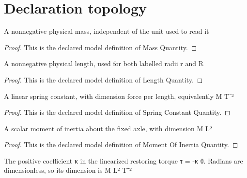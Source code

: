 \section{Declaration topology}
\begin{definition}
  \label{def:physics:phyx-mini-0272:phyxminiproblems-problemphyxmini0272-massquantity}
  A nonnegative physical mass, independent of the unit used to read it
\end{definition}
\begin{proof}
  This is the declared model definition of Mass Quantity.
\end{proof}
\begin{definition}
  \label{def:physics:phyx-mini-0272:phyxminiproblems-problemphyxmini0272-lengthquantity}
  A nonnegative physical length, used for both labelled radii r and R
\end{definition}
\begin{proof}
  This is the declared model definition of Length Quantity.
\end{proof}
\begin{definition}
  \label{def:physics:phyx-mini-0272:phyxminiproblems-problemphyxmini0272-springconstantquantity}
  A linear spring constant, with dimension force per length, equivalently M T⁻²
\end{definition}
\begin{proof}
  This is the declared model definition of Spring Constant Quantity.
\end{proof}
\begin{definition}
  \label{def:physics:phyx-mini-0272:phyxminiproblems-problemphyxmini0272-momentofinertiaquantity}
  A scalar moment of inertia about the fixed axle, with dimension M L²
\end{definition}
\begin{proof}
  This is the declared model definition of Moment Of Inertia Quantity.
\end{proof}
\begin{definition}
  \label{def:physics:phyx-mini-0272:phyxminiproblems-problemphyxmini0272-restoringtorquecoefficientquantity}
  The positive coefficient κ in the linearized restoring torque τ = -κ θ. Radians are dimensionless, so its dimension is M L² T⁻²
\end{definition}
